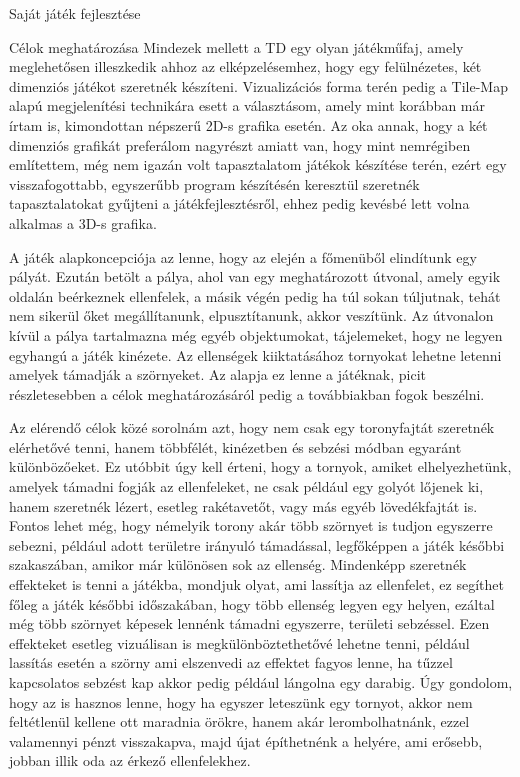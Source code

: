 \begin{MyChapter}{Saját játék fejlesztése}
\begin{MySection}{Célok meghatározása}
		Mindezek mellett a TD egy olyan játékműfaj, amely meglehetősen illeszkedik ahhoz az elképzelésemhez, hogy egy felülnézetes, két dimenziós játékot szeretnék készíteni. Vizualizációs forma terén pedig a Tile-Map alapú megjelenítési technikára esett a választásom, amely mint korábban már írtam is, kimondottan népszerű 2D-s grafika esetén. Az oka annak, hogy a két dimenziós grafikát preferálom nagyrészt amiatt van, hogy mint nemrégiben említettem, még nem igazán volt tapasztalatom játékok készítése terén, ezért egy visszafogottabb, egyszerűbb program készítésén keresztül szeretnék tapasztalatokat gyűjteni a játékfejlesztésről, ehhez pedig kevésbé lett volna alkalmas a 3D-s grafika.
		
		A játék alapkoncepciója az lenne, hogy az elején a főmenüből elindítunk egy pályát. Ezután betölt a pálya, ahol van egy meghatározott útvonal, amely egyik oldalán beérkeznek ellenfelek, a másik végén pedig ha túl sokan túljutnak, tehát nem sikerül őket megállítanunk, elpusztítanunk, akkor veszítünk. Az útvonalon kívül a pálya tartalmazna még egyéb objektumokat, tájelemeket, hogy ne legyen egyhangú a játék kinézete. Az ellenségek kiiktatásához tornyokat lehetne letenni amelyek támadják a szörnyeket. Az alapja ez lenne a játéknak, picit részletesebben a célok meghatározásáról pedig a továbbiakban fogok beszélni.
		
		Az elérendő célok közé sorolnám azt, hogy nem csak egy toronyfajtát szeretnék elérhetővé tenni, hanem többfélét, kinézetben és sebzési módban egyaránt különbözőeket. Ez utóbbit úgy kell érteni, hogy a tornyok, amiket elhelyezhetünk, amelyek támadni fogják az ellenfeleket, ne csak például egy golyót lőjenek ki, hanem szeretnék lézert, esetleg rakétavetőt, vagy más egyéb lövedékfajtát is. Fontos lehet még, hogy némelyik torony akár több szörnyet is tudjon egyszerre sebezni, például adott területre irányuló támadással, legfőképpen a játék későbbi szakaszában, amikor már különösen sok az ellenség. Mindenképp szeretnék effekteket is tenni a játékba, mondjuk olyat, ami lassítja az ellenfelet, ez segíthet főleg a játék későbbi időszakában, hogy több ellenség legyen egy helyen, ezáltal még több szörnyet képesek lennénk támadni egyszerre, területi sebzéssel. Ezen effekteket esetleg vizuálisan is megkülönböztethetővé lehetne tenni, például lassítás esetén a szörny ami elszenvedi az effektet fagyos lenne, ha tűzzel kapcsolatos sebzést kap akkor pedig például lángolna egy darabig.
		Úgy gondolom, hogy az is hasznos lenne, hogy ha egyszer leteszünk egy tornyot, akkor nem feltétlenül kellene ott maradnia örökre, hanem akár lerombolhatnánk, ezzel valamennyi pénzt visszakapva, majd újat építhetnénk a helyére, ami erősebb, jobban illik oda az érkező ellenfelekhez. 
		

\end{MySection}
\end{MyChapter}
